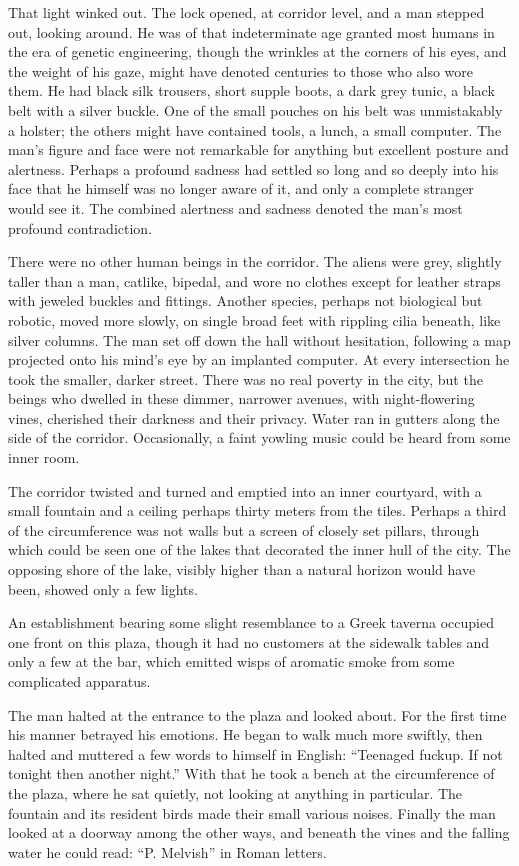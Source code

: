 \documentclass[english,11pt,letterpaper,onecolumn]{scrbook}
\begin{document}
	That light winked out.  The lock opened, at corridor level, and a man stepped out, looking around.  He was of that indeterminate age granted most humans in the era of genetic engineering, though the wrinkles at the corners of his eyes, and the weight of his gaze, might have denoted centuries to those who also wore them.  He had black silk trousers, short supple boots, a dark grey tunic, a black belt with a silver buckle.   One of the small pouches on his belt was unmistakably a holster; the others might have contained tools, a lunch, a small computer.  The man's figure and face were not remarkable for anything but excellent posture and alertness.  Perhaps a profound sadness had settled so long and so deeply into his face that he himself was no longer aware of it, and only a complete stranger would see it.  The combined alertness and sadness denoted the man's most profound contradiction.

	There were no other human beings in the corridor.  The aliens were grey, slightly taller than a man, catlike, bipedal, and wore no clothes except for leather straps with jeweled buckles and fittings.  Another species, perhaps not biological but robotic, moved more slowly, on single broad feet with rippling cilia beneath, like silver columns.  The man set off down the hall without hesitation, following a map projected onto his mind's eye by an implanted computer.  At every intersection he took the smaller, darker street.  There was no real poverty in the city, but the beings who dwelled in these dimmer, narrower avenues, with night-flowering vines, cherished their darkness and their privacy.  Water ran in gutters along the side of the corridor.  Occasionally, a faint yowling music could be heard from some inner room.

	The corridor twisted and turned and emptied into an inner courtyard, with a small fountain and a ceiling perhaps thirty meters from the tiles.  Perhaps a third of the circumference was not walls but a screen of closely set pillars, through which could be seen one of the lakes that decorated the inner hull of the city.  The opposing shore of the lake, visibly higher than a natural horizon would have been, showed only a few lights.

	An establishment bearing some slight resemblance to a Greek taverna occupied one front on this plaza, though it had no customers at the sidewalk tables and only a few at the bar, which emitted wisps of aromatic smoke from some complicated apparatus.

	The man halted at the entrance to the plaza and looked about.  For the first time his manner betrayed his emotions.  He began to walk much more swiftly, then halted and muttered a few words to himself in English:  ``Teenaged fuckup.  If not tonight then another night.''  With that he took a bench at the circumference of the plaza, where he sat quietly, not looking at anything in particular.  The fountain and its resident birds made their small various noises.  Finally the man looked at a doorway among the other ways, and beneath the vines and the falling water he could read:  ``P. Melvish'' in Roman letters.
\end{document}
